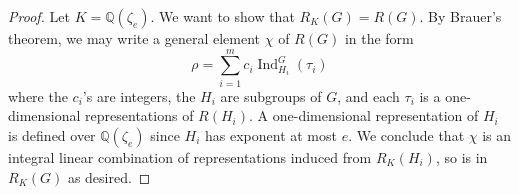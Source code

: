 \documentclass[12pt]{article}
\theoremstyle{plain}
\theoremstyle{definition}
\theoremstyle{remark}
\numberwithin{equation}{section}
\begin{document}
\begin{proof}
Let $K=\mathbb{Q}(\zeta_e)$.  We want to show that $R_K(G)=R(G)$.
By Brauer's theorem, we may write a general element $\chi$ of $R(G)$
in the form
\[
\rho = \sum_{i=1}^m c_i\operatorname{Ind}_{H_i}^G(\tau_i)
\]
where the $c_i$'s are integers, the $H_i$ are subgroups of $G$,
and each $\tau_i$ is a one-dimensional representations of $R(H_i)$.
A one-dimensional representation of $H_i$ is defined over
$\mathbb{Q}(\zeta_e)$ since $H_i$ has exponent at most $e$.
We conclude that $\chi$ is an integral linear combination of
representations induced from $R_K(H_i)$, so is in $R_K(G)$ as desired.
\end{proof}



\end{document}
